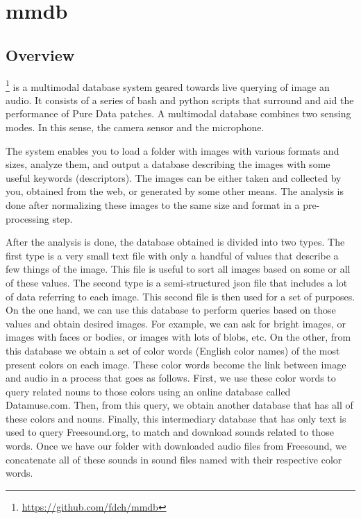 \chapter*{mmdb}

\section*{Overview}

\footnote{\url{https://github.com/fdch/mmdb}} is a multimodal database system geared towards live querying of image an audio. It consists of a series of bash and python scripts that surround and aid the performance of Pure Data patches. A multimodal database combines two sensing modes. In this sense, the camera sensor and the microphone.

The system enables you to load a folder with images with various formats and sizes, analyze them, and output a database describing the images with some useful keywords (descriptors). The images can be either taken and collected by you, obtained from the web, or generated by some other means. The analysis is done after normalizing these images to the same size and format in a pre-processing step.

After the analysis is done, the database obtained is divided into two types. The first type is a very small text file with only a handful of values that describe a few things of the image. This file is useful to sort all images based on some or all of these values. The second type is a semi-structured \gls{json} file that includes a lot of data referring to each image. This second file is then used for a set of purposes. On the one hand, we can use this database to perform queries based on those values and obtain desired images. For example, we can ask for bright images, or images with faces or bodies, or images with lots of blobs, etc. On the other, from this database we obtain a set of color words (English color names) of the most present colors on each image. These color words become the link between image and audio in a process that goes as follows. First, we use these color words to query related nouns to those colors using an online database called Datamuse.com. Then, from this query, we obtain another database that has all of these colors and nouns. Finally, this intermediary database that has only text is used to query Freesound.org, to match and download sounds related to those words. Once we have our folder with downloaded audio files from Freesound, we concatenate all of these sounds in sound files named with their respective color words.

